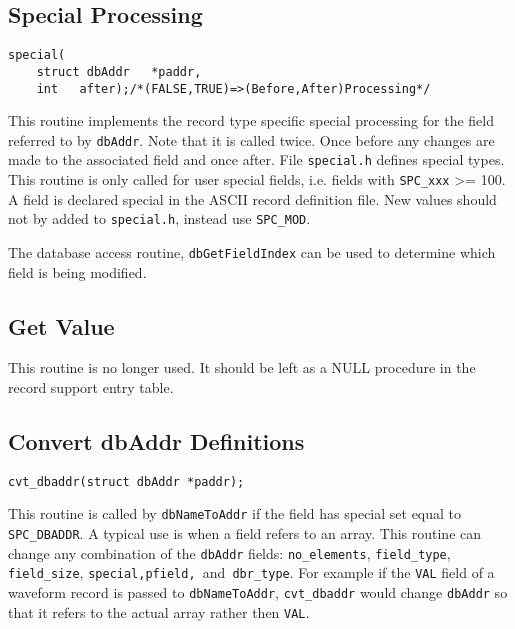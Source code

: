 \subsection{Special Processing}

\begin{verbatim}
special(
    struct dbAddr   *paddr,
    int   after);/*(FALSE,TRUE)=>(Before,After)Processing*/
\end{verbatim}

This routine implements the record type specific special processing for the field referred to by \verb|dbAddr|. Note that it is 
called twice. Once before any changes are made to the associated field and once after. File \verb|special.h| defines special 
types. This routine is only called for user special fields, i.e. fields with \verb|SPC_xxx| \textgreater{}= 100. A field is declared special in the 
ASCII record definition file. New values should not by added to \verb|special.h|, instead use \verb|SPC_MOD|.

The database access routine, \verb|dbGetFieldIndex| can be used to determine which field is being modified.

\subsection{Get Value}

This routine is no longer used. It should be left as a NULL procedure in the record support entry table.

\subsection{Convert dbAddr Definitions}

\begin{verbatim}
cvt_dbaddr(struct dbAddr *paddr);
\end{verbatim}

This routine is called by \verb|dbNameToAddr| if the field has special set equal to \verb|SPC_DBADDR|. A typical use is when a field 
refers to an array. This routine can change any combination of the \verb|dbAddr| fields: \verb|no_elements|, \verb|field_type|, 
\verb|field_size|, \verb|special,pfield, |and\verb| dbr_type|. For example if the \verb|VAL| field of a waveform record is passed to 
\verb|dbNameToAddr|, \verb|cvt_dbaddr| would change \verb|dbAddr| so that it refers to the actual array rather then \verb|VAL|.

